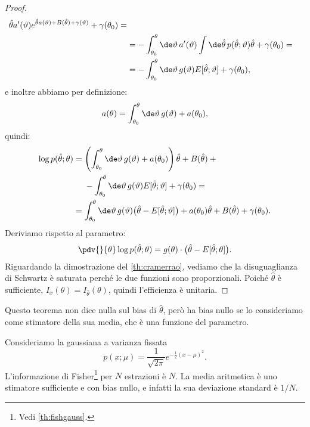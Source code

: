 \begin{proof}
\begin{align*}
		\hat\theta a'(\vartheta) e^{\hat\theta a(\vartheta) + B(\hat\theta) + \gamma(\vartheta)}
		+ \gamma(\theta_0) = \\
		&= - \int_{\theta_0}^\theta \de\vartheta\, a'(\vartheta)
		\int\de\hat\theta\, p(\hat\theta;\vartheta) \hat\theta
		+ \gamma(\theta_0) = \\
		&= - \int_{\theta_0}^\theta \de\vartheta\, g(\vartheta) E[\hat\theta;\vartheta]
		+ \gamma(\theta_0),
	\end{align*}
	e inoltre abbiamo per definizione:
	\begin{equation*}
		a(\theta)
		= \int_{\theta_0}^\theta \de\vartheta\, g(\vartheta) + a(\theta_0),
	\end{equation*}
	quindi:
	\begin{align*}
		\log p(\hat\theta;\theta)
		&= \left( \int_{\theta_0}^\theta \de\vartheta\, g(\vartheta) + a(\theta_0) \right) \hat\theta
		+ B(\hat\theta) + {}\\
		&\phantom{{}={}}- \int_{\theta_0}^\theta \de\vartheta\, g(\vartheta) E[\hat\theta;\vartheta] + \gamma(\theta_0) = \\
		&= \int_{\theta_0}^\theta \de\vartheta\, g(\vartheta) \big(\hat\theta-E[\hat\theta;\vartheta]\big)
		+ a(\theta_0)\hat\theta + B(\hat\theta) + \gamma(\theta_0).
	\end{align*}
	Deriviamo rispetto al parametro:
	\begin{equation*}
		\pdv{}{\theta} \log p(\hat\theta;\theta)
		= g(\theta) \cdot \big(\hat\theta-E[\hat\theta;\theta]\big).
	\end{equation*}
	Riguardando la dimostrazione del \autoref{th:cramerrao},
	vediamo che la disuguaglianza di Schwartz è saturata perché le due funzioni sono proporzionali.
	Poiché $\hat\theta$ è sufficiente, $I_x(\theta)=I_{\hat\theta}(\theta)$,
	quindi l'efficienza è unitaria.
\end{proof}

Questo teorema non dice nulla sul bias di $\hat\theta$,
però ha bias nullo se lo consideriamo come stimatore della sua media,
che è una funzione del parametro.

\begin{example}
	Consideriamo la gaussiana a varianza fissata
	\begin{equation*}
		p(x;\mu)
		= \frac1{\sqrt{2\pi}} e^{-\frac12 (x-\mu)^2}.
	\end{equation*}
	L'informazione di Fisher\footnote{Vedi \autoref{th:fishgauss}.} per $N$ estrazioni è $N$.
	La media aritmetica è uno stimatore sufficiente e con bias nullo,
	e infatti la sua deviazione standard è $1/N$.
\end{example}

